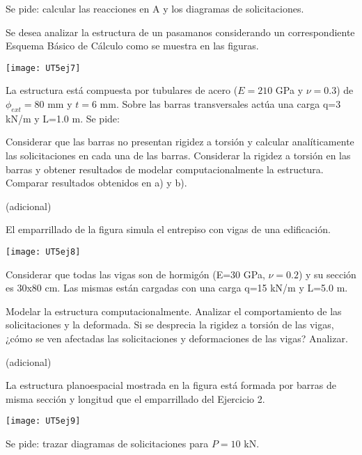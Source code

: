 Se pide: calcular las reacciones en A y los diagramas de solicitaciones.

\begin{center}
	\def\svgwidth{0.5\textwidth}

\end{center}

\ejercicio

Se desea analizar la estructura de un pasamanos considerando un correspondiente Esquema Básico de Cálculo como se muestra en las figuras.

\begin{center}
	\texttt{[image: UT5ej7]}
\end{center}

La estructura está compuesta por tubulares de acero ($E=210$ GPa y $\nu=0.3$) de $\phi_{ext}=80$ mm y $t=6$ mm. %
%
Sobre las barras transversales actúa una carga q=3 kN/m y L=1.0 m. Se pide:

\parte Considerar que las barras no presentan rigidez a torsión y calcular analíticamente las solicitaciones en cada una de las barras.
\parte Considerar la rigidez a torsión en las barras y obtener resultados de modelar computacionalmente la estructura.
\parte Comparar resultados obtenidos en a) y b).


\ejercicio (adicional) 

El emparrillado de la figura simula el entrepiso con vigas de una edificación. 

\begin{center}
	\texttt{[image: UT5ej8]}
\end{center}

Considerar que todas las vigas son de hormigón (E=30 GPa, $\nu=0.2$) y su sección es 30x80 cm. Las mismas están cargadas con una carga q=15 kN/m y L=5.0 m.

\parte Modelar la estructura computacionalmente. Analizar el comportamiento de las solicitaciones y la deformada.
\parte Si se desprecia la rigidez a torsión de las vigas, ¿cómo se ven afectadas las solicitaciones y deformaciones de las vigas? Analizar.


\ejercicio (adicional) 

La estructura planoespacial mostrada en la figura está formada por barras de misma sección y longitud que el emparrillado del Ejercicio 2.

\begin{center}
	\texttt{[image: UT5ej9]}
\end{center}

Se pide: trazar diagramas de solicitaciones para $P=10$ kN.

